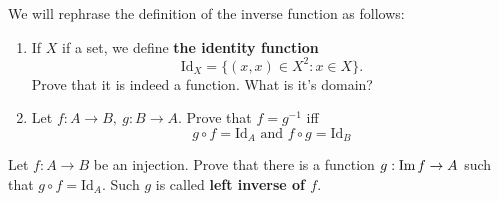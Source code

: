 \begin{prob} We will rephrase the definition of the inverse function as follows:
	\begin{enumerate}
		\item If $X$ if a set, we define \textbf{the identity function}
			$$\text{Id}_X=\{(x,x)\in X^2 : x\in X\}.$$
			Prove that it is indeed a function. What is it's domain?
		\item Let $f:A\to B,~g:B\to A$. Prove that $f=g^{-1}$ iff
			$$g\circ f = \text{Id}_A \text{ and } f\circ g = \text{Id}_B$$
	\end{enumerate}
\end{prob}

\begin{prob}
  Let $f: A\to B$ be an injection. Prove that there is a function
  $g: \text{Im\,} f \to A$ such that $g\circ f = \text{Id}_A.$
  Such $g$ is called \textbf{left inverse of $f$}.
\end{prob}
